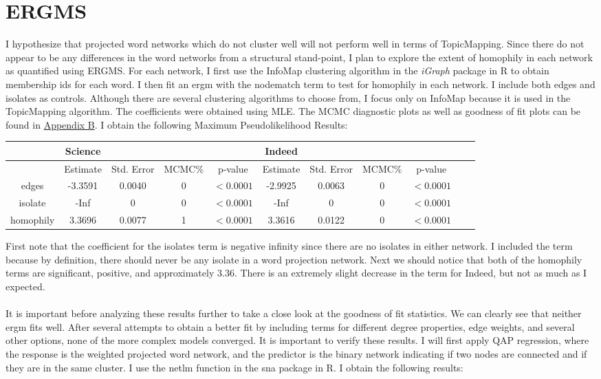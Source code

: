 \documentclass[12pt]{article}
\begin{document}
\section{ERGMS}

I hypothesize that projected word networks which do not cluster well will not perform well in terms of TopicMapping. Since there do not appear to be any differences in the word networks from a structural stand-point, I plan to explore the extent of homophily in each network as quantified using ERGMS. For each network, I first use the InfoMap clustering algorithm in the \textit{iGraph} package in R to obtain membership ids for each word. I then fit an ergm with the nodematch term to test for homophily in each network. I include both edges and isolates as controls. Although there are several clustering algorithms to choose from, I focus only on InfoMap because it is used in the TopicMapping algorithm. The coefficients were obtained using MLE. The MCMC diagnostic plots as well as goodness of fit plots can be found in \hyperlink{B}{Appendix B}. I obtain the following Maximum Pseudolikelihood Results:
\vspace{2mm}
\begin{center}
	\begin{tabular}{ |c|c|c|c|c||c|c|c|c|c|c|  }
		\hline
		&Science&&&&Indeed&&& \\
		\hline
		&Estimate&Std. Error&MCMC$\%$&p-value&Estimate&Std. Error&MCMC$\%$&p-value \\ 
		\hline 
		edges&-3.3591&0.0040&0&$<0.0001$&-2.9925&0.0063&0&$<0.0001$\\
		isolate&-Inf&0&0&$<0.0001$&-Inf&0&0&$<0.0001$\\
		homophily&3.3696&0.0077&1&$<0.0001$&3.3616&0.0122&0&$<0.0001$\\
		\hline
	\end{tabular}
\end{center}
\vspace{2mm}
First note that the coefficient for the isolates term is negative infinity since there are no isolates in either network. I included the term because by definition, there should never be any isolate in a word projection network. Next we should notice that both of the homophily terms are significant, positive, and approximately $3.36$. There is an extremely slight decrease in the term for Indeed, but not as much as I expected. 
\\
\\
It is important before analyzing these results further to take a close look at the goodness of fit statistics. We can clearly see that neither ergm fits well. After several attempts to obtain a better fit by including terms for different degree properties, edge weights, and several other options, none of the more complex models converged. It is important to verify these results. I will first apply QAP regression, where the response is the weighted projected word network, and the predictor is the binary network indicating if two nodes are connected and if they are in the same cluster. I use the netlm function in the sna package in R. I obtain the following results:
\end{document}
